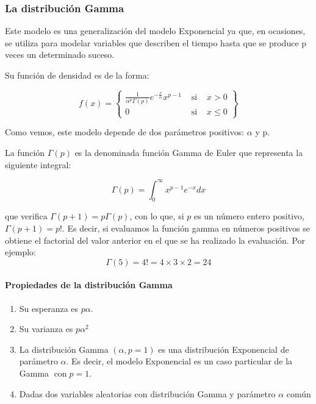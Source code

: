 \documentclass[
]{article}
\begin{document}
\subsubsection{La distribución Gamma}\label{la-distribuciuxf3n-gamma}

Este modelo es una generalización del modelo Exponencial ya que, en ocasiones, se utiliza para modelar variables que describen el tiempo hasta que se produce p veces un determinado suceso.

Su función de densidad es de la forma:

\[
f(x)=\left\{\begin{array}{lll}
\frac{1}{\alpha^{p} \Gamma(p)} e^{-\frac{x}{\alpha}} x^{p-1} & \text { si } & x>0 \\
0 & \text { si } & x \leq 0
\end{array}\right\}
\]

Como vemos, este modelo depende de dos parámetros positivos: \(\alpha\) y p.~

La función \(\Gamma(p)\) es la denominada función Gamma de Euler que representa la siguiente integral:

\[
\Gamma(p)=\int_{0}^{\infty} x^{p-1} e^{-x} d x
\]

que verifica \(\Gamma(p+1)=p \Gamma(p)\), con lo que, si \(p\) es un número entero positivo, \(\Gamma(p+1)=p!\). Es decir, si evaluamos la función gamma en números positivos se obtiene el factorial del valor anterior en el que se ha realizado la evaluación. Por ejemplo:
\[
\Gamma(5) = 4! =4\times 3 \times 2 =24
\]

\paragraph{Propiedades de la distribución Gamma}\label{propiedades-de-la-distribuciuxf3n-gamma}

\begin{enumerate}
\def\labelenumi{\arabic{enumi}.}
\item
  Su esperanza es \(p \alpha\).
\item
  Su varianza es \(p \alpha^{2}\)
\item
  La distribución Gamma \((\alpha, p=1)\) es una distribución Exponencial de parámetro \(\alpha\). Es decir, el modelo Exponencial es un caso particular de la Gamma \(\operatorname{con} p=1\).
\item
  Dadas dos variables aleatorias con distribución Gamma y parámetro \(\alpha\) común
\end{enumerate}
\end{document}
